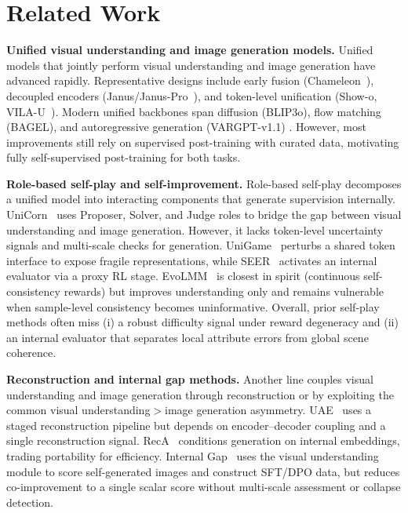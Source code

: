 
\section{Related Work}
\label{sec:related_work}

\noindent\textbf{Unified visual understanding and image generation models.}
Unified models that jointly perform visual understanding and image generation have advanced rapidly. Representative designs include early fusion (Chameleon~\citep{team2024chameleon}), decoupled encoders (Janus/Janus-Pro~\citep{wu2025janus, chen2025januspro}), and token-level unification (Show-o, VILA-U~\citep{xie2024showo, wu2024vilau}). Modern unified backbones span diffusion (BLIP3o), flow matching (BAGEL), and autoregressive generation (VARGPT-v1.1) \citep{chen2025blip3o, deng2025bagel, zhuang2025vargpt}. However, most improvements still rely on supervised post-training with curated data, motivating fully self-supervised post-training for both tasks.

\noindent\textbf{Role-based self-play and self-improvement.}
Role-based self-play decomposes a unified model into interacting components that generate supervision internally. UniCorn~\citep{han2026unicorn} uses Proposer, Solver, and Judge roles to bridge the gap between visual understanding and image generation. However, it lacks token-level uncertainty signals and multi-scale checks for generation. UniGame~\citep{su2025unigame} perturbs a shared token interface to expose fragile representations, while SEER~\citep{tang2026endogenous} activates an internal evaluator via a proxy RL stage. EvoLMM~\citep{thawakar2025evolmm} is closest in spirit (continuous self-consistency rewards) but improves understanding only and remains vulnerable when sample-level consistency becomes uninformative. Overall, prior self-play methods often miss (i) a robust difficulty signal under reward degeneracy and (ii) an internal evaluator that separates local attribute errors from global scene coherence.

\noindent\textbf{Reconstruction and internal gap methods.}
Another line couples visual understanding and image generation through reconstruction or by exploiting the common visual understanding$>$image generation asymmetry. UAE~\citep{yan2025understandinggeneration} uses a staged reconstruction pipeline but depends on encoder--decoder coupling and a single reconstruction signal. RecA~\citep{xie2025reconstruction} conditions generation on internal embeddings, trading portability for efficiency. Internal Gap~\citep{han2025internalgap} uses the visual understanding module to score self-generated images and construct SFT/DPO data, but reduces co-improvement to a single scalar score without multi-scale assessment or collapse detection.

